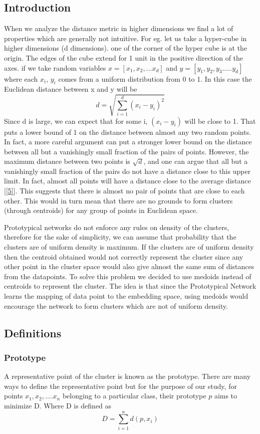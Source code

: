 \subsection{Introduction}
When we analyze the distance metric in higher dimensions we find a lot of properties which are generally not intuitive. For eg. let us take a hyper-cube in higher dimensions (d dimensions). one of the corner of the hyper cube is at the origin. The edges of the cube extend for 1 unit in the positive direction of the axes. if we take random variables \(x = [x_1, x_2, ...x_d]\) and \(y=[y_1, y_2, y_3.....y_d]\) where each \(x_i\), \(y_i\) comes from a uniform distribution from 0 to 1. In this case the Euclidean distance between x and y will be 
\[d = \sqrt{\sum_{i=1}^{d} (x_i - y_i)^2}\]
Since d is large, we can expect that for some i, \((x_i  -  y_i)\) will be close to 1. That puts a lower bound of 1 on the distance between almost any two random points. In fact, a more careful argument can put a stronger lower bound on the distance between all but a vanishingly small fraction of the pairs of points. However, the maximum distance between two points is \(\sqrt{d}\), and one can argue that all but a vanishingly small fraction of the pairs do not have a distance close to this upper limit. In fact, almost all points will have a distance close to the average distance [\ref{5}].
This suggests that there is almost no pair of points that are close to each other. This would in turn mean that there are no grounds to form clusters (through centroids) for any group of points in Euclidean space.

Prototypical networks do not enforce any rules on density of the clusters, therefore for the sake of simplicity, we can assume that probability that the clusters are of uniform density is maximum. If the clusters are of uniform density then the centroid obtained would not correctly represent the cluster since any other point in the cluster space would also give almost the same sum of distances from the datapoints. To solve this problem we decided to use medoids instead of centroids to represent the cluster. The idea is that since the Prototypical Network learns the mapping of data point to the embedding space, using medoids would encourage the network to form clusters which are not of uniform density.


\subsection{Definitions}
\subsubsection{Prototype}
A representative point of the cluster is known as the prototype. There are many ways to define the representative point but for the purpose of our study, for points \( x_1, x_2, ....x_n\) belonging to a particular class, their prototype \(p\) aims to minimize D. Where D is defined as
\[D = \sum_{i=1}^{n}d(p, x_i)\]
